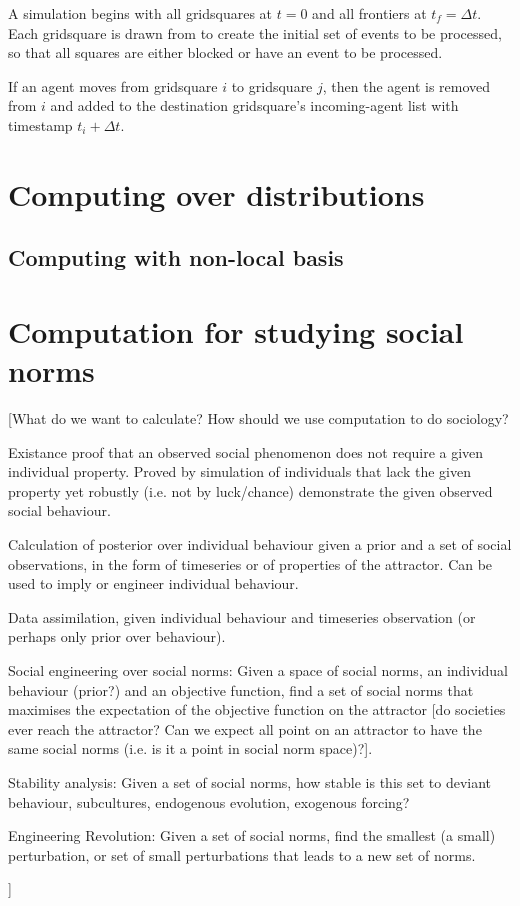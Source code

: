 \documentclass[a4paper]{article}
\begin{document}
A simulation begins with all gridsquares at $t=0$ and all frontiers at $t_f=\Delta t$. Each gridsquare is drawn from to create the initial set of events to be processed, so that all squares are either blocked or have an event to be processed.

If an agent moves from gridsquare $i$ to gridsquare $j$, then the agent is removed from $i$ and added to the destination gridsquare's incoming-agent list with timestamp $t_i + \Delta t$.

\section{Computing over distributions}

\subsection{Computing with non-local basis}



\section{Computation for studying social norms}

[What do we want to calculate? How should we use computation to do sociology?

Existance proof that an observed social phenomenon does not require a given individual property. Proved by simulation of individuals that lack the given property yet robustly (i.e. not by luck/chance) demonstrate the given observed social behaviour.

Calculation of posterior over individual behaviour given a prior and a set of social observations, in the form of timeseries or of properties of the attractor. Can be used to imply or engineer individual behaviour.

Data assimilation, given individual behaviour and timeseries observation (or perhaps only prior over behaviour).

Social engineering over social norms: Given a space of social norms, an individual behaviour (prior?) and an objective function, find a set of social norms that maximises the expectation of the objective function on the attractor [do societies ever reach the attractor? Can we expect all point on an attractor to have the same social norms (i.e. is it a point in social norm space)?]. 

Stability analysis: Given a set of social norms, how stable is this set to deviant behaviour, subcultures, endogenous evolution, exogenous forcing?

Engineering Revolution: Given a set of social norms, find the smallest (a small) perturbation, or set of small perturbations that leads to a new set of norms.

]


\end{document}
